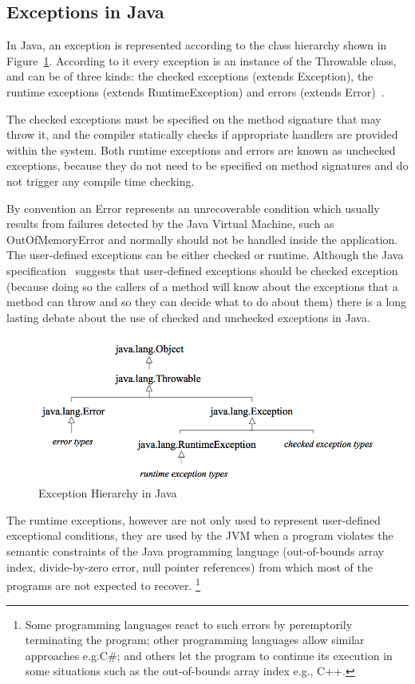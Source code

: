 \documentclass[conference]{IEEEtran}
\begin{document}
\subsection{Exceptions in Java} \label{sec:extypes}

In Java, an exception is represented according to the class hierarchy shown in
Figure~\ref{fig:exchier}.  According to it every exception is an
instance of the Throwable class, and can be of three kinds: the checked exceptions
(extends Exception), the runtime exceptions (extends RuntimeException) and errors
(extends Error)~\cite{gosling2000java}. 

The checked exceptions must be specified on the method signature that may throw it, 
and the compiler statically checks if appropriate handlers are provided within the system.
Both runtime exceptions and errors are known as unchecked exceptions, because 
they do not need to be specified on method signatures and do not trigger any 
compile time checking.

By convention an Error represents an unrecoverable condition which usually results
from failures detected by the Java Virtual Machine, such as OutOfMemoryError and
normally should not be handled inside the application. The user-defined exceptions 
can be either checked or runtime. Although the Java specification~\cite{gosling2000java} 
suggests that user-defined exceptions should be checked exception (because doing so 
the callers of a method will know about the exceptions that a method can throw and so 
they can decide what to do about them) there is a long lasting debate about the use of 
checked and unchecked exceptions in Java. 

\begin{figure} \centering \includegraphics[width=\hsize]{new2_hierarchy.png}
  \caption{Exception Hierarchy in Java} \label{fig:exchier} \end{figure}

The runtime exceptions, however are not only used to represent user-defined
exceptional conditions, they are used by the JVM when a program violates 
the semantic constraints of the Java programming language (out-of-bounds array index, divide-by-zero 
error, null pointer references) from which most of the programs are not expected to recover. 
\footnote{Some programming languages react to such errors by peremptorily terminating the program; 
other programming languages allow similar approaches e.g.C\#; and others let the program to continue
 its execution in some situations such as the out-of-bounds array index e.g., C++. }
\end{document}
